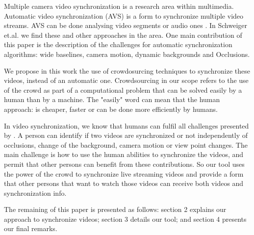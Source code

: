 Multiple camera video synchronization is a research area within multimedia. Automatic video synchronization (AVS) is a form to synchronize multiple video streams. AVS can be done analysing video segments \cite{wang2014videosnapping} or audio ones \cite{su2012making}. In Schweiger et.al.\cite{schweiger2013fully} we find these and other approaches in the area. One main contribution of this paper is the description of the challenges for automatic synchronization algorithms: wide baselines, camera motion, dynamic backgrounds and Occlusions.

We propose in this work the use of crowdosurcing techniques to synchronize these videos, instead of an automatic one. Crowdsourcing \cite{howe2006rise} in our scope refers to the use of the crowd as part of a computational problem that can be solved easily by a human than by a machine. The "easily" word can mean that the human approach: is cheaper, faster or can be done more efficiently by humans.

In video synchronization, we know that humans can fulfil all challenges presented by \cite{schweiger2013fully}. A person can identify if two videos are synchronized or not independently of occlusions, change of the background, camera motion or view point changes. The main challenge is how to use the human abilities to synchronize the videos, and permit that other persons can benefit from these contributions. So our tool uses the power of the crowd to synchronize live streaming videos and provide a form that other persons that want to watch those videos can receive both videos and synchronization info.

The remaining of this paper is presented as follows: section 2 explains our approach to synchronize videos; section 3 details our tool; and section 4 presents our final remarks.




